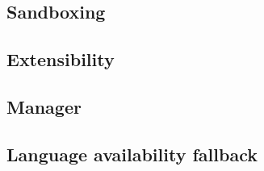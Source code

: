 
\subsection{Sandboxing}
\subsection{Extensibility}
\subsection{Manager}
\subsection{Language availability fallback}

